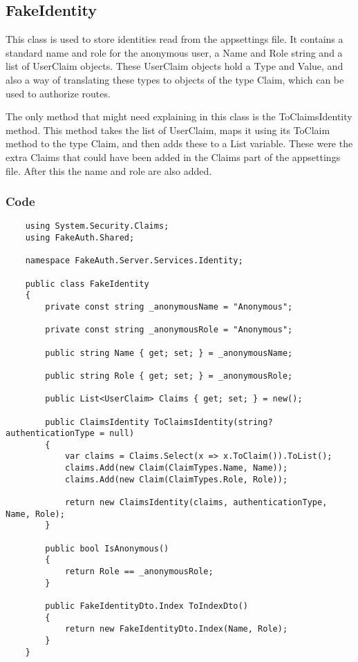 \subsection{FakeIdentity}

This class is used to store identities read from the appsettings file. It contains a standard name and role for the anonymous user, a Name and Role string and a list of UserClaim objects. These UserClaim objects hold a Type and Value, and also a way of translating these types to objects of the type Claim, which can be used to authorize routes.

The only method that might need explaining in this class is the ToClaimsIdentity method. This method takes the list of UserClaim, maps it using its ToClaim method to the type Claim, and then adds these to a List variable. These were the extra Claims that could have been added in the Claims part of the appsettings file. After this the name and role are also added.

\subsubsection{Code}

\begin{verbatim}
    using System.Security.Claims;
    using FakeAuth.Shared;
    
    namespace FakeAuth.Server.Services.Identity;
    
    public class FakeIdentity
    {
        private const string _anonymousName = "Anonymous";
        
        private const string _anonymousRole = "Anonymous";
        
        public string Name { get; set; } = _anonymousName;
        
        public string Role { get; set; } = _anonymousRole;
        
        public List<UserClaim> Claims { get; set; } = new();
        
        public ClaimsIdentity ToClaimsIdentity(string? authenticationType = null)
        {
            var claims = Claims.Select(x => x.ToClaim()).ToList();
            claims.Add(new Claim(ClaimTypes.Name, Name));
            claims.Add(new Claim(ClaimTypes.Role, Role));
            
            return new ClaimsIdentity(claims, authenticationType, Name, Role);
        }
        
        public bool IsAnonymous()
        {
            return Role == _anonymousRole;
        }
        
        public FakeIdentityDto.Index ToIndexDto()
        {
            return new FakeIdentityDto.Index(Name, Role);
        }
    }
\end{verbatim}

